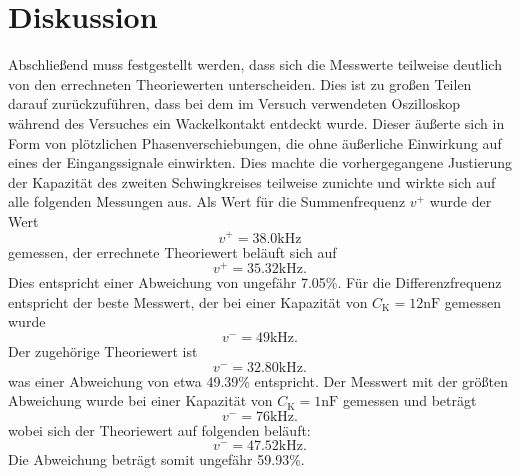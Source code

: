 \section{Diskussion}
\label{sec:Diskussion}
Abschließend muss festgestellt werden, dass sich die Messwerte teilweise deutlich von den errechneten Theoriewerten unterscheiden. Dies ist zu großen Teilen darauf zurückzuführen, dass bei
dem im Versuch verwendeten Oszilloskop während des Versuches ein Wackelkontakt entdeckt wurde. Dieser äußerte sich in Form von plötzlichen Phasenverschiebungen, die ohne äußerliche
Einwirkung auf eines der Eingangssignale einwirkten. Dies machte die vorhergegangene Justierung der Kapazität des zweiten Schwingkreises teilweise zunichte und wirkte sich auf alle
folgenden Messungen aus.
\newline
Als Wert für die Summenfrequenz $ v^{+} $ wurde der Wert
\begin{equation*}
    v^{+} = 38.0 \si{\kilo\hertz}
\end{equation*}
gemessen, der errechnete Theoriewert beläuft sich auf
\begin{equation*}
    v^{+} = 35.32 \si{\kilo\hertz}.
\end{equation*}
Dies entspricht einer Abweichung von ungefähr 7.05\%.
\newline
Für die Differenzfrequenz entspricht der beste Messwert, der bei einer Kapazität von $C_{\text{K}} = 12 \si{\nano\farad}$ gemessen wurde
\begin{equation*}
    v^{-} = 49 \si{\kilo\hertz}.
\end{equation*}
Der zugehörige Theoriewert ist
\begin{equation*}
    v^{-} = 32.80 \si{\kilo\hertz}.
\end{equation*}
was einer Abweichung von etwa 49.39\% entspricht.
\newline
Der Messwert mit der größten Abweichung wurde bei einer Kapazität von $C_{\text{K}} = 1 \si{\nano\farad}$ gemessen und beträgt
\begin{equation*}
    v^{-} = 76 \si{\kilo\hertz}.
\end{equation*}
wobei sich der Theoriewert auf folgenden beläuft:
\begin{equation*}
    v^{-} = 47.52 \si{\kilo\hertz}.
\end{equation*}
Die Abweichung beträgt somit ungefähr 59.93\%.